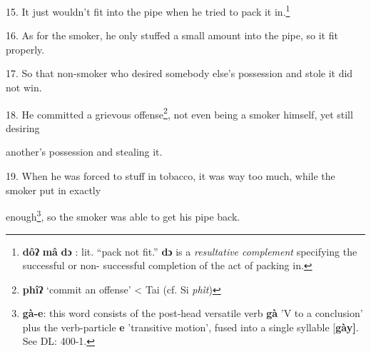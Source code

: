 15. It just wouldn't fit into the pipe when he tried to pack it in.\footnote{\textbf{dôʔ} \textbf{mâ} \textbf{dɔ} : lit. ``pack not fit.'' \textbf{dɔ} is a \textit{resultative complement }specifying the successful or non- successful completion of the act of packing in.}

16. As for the smoker, he only stuffed a small amount into the pipe, so it fit
properly.

17. So that non-smoker who desired somebody else's possession and stole it did
not win.

18. He committed a grievous offense\footnote{\textbf{phîʔ} `commit an offense' < Tai (cf. Si \textit{phìt})}, not even being a smoker himself, yet still
desiring

another's possession and stealing it.

19. When he was forced to stuff in tobacco, it was way too much, while the smoker
put in exactly

enough\footnote{\textbf{gà-e}: this word consists of the post-head versatile verb \textbf{gà} 'V to a conclusion' plus the verb-particle \textbf{e} 'transitive motion', fused into a single syllable [\textbf{gày]}. See DL: 400-1.}, so the smoker was able to get his pipe back.

